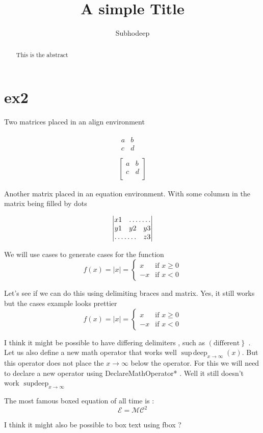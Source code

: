 \documentclass{article}[12pt]
\DeclareMathOperator*{\supdeep}{supdeep}
\begin{document}
\title{A simple Title}
\author{Subhodeep}

\maketitle

\begin{abstract}
This is the abstract
\end{abstract}

\section{ex2}

Two matrices placed in an align environment

\begin{align}
\begin{matrix}
a&b\\
c&d\\
\end{matrix}\\
\begin{bmatrix}
a&b\\
c&d\\
\end{bmatrix}
\end{align}

Another matrix placed in an equation environment. With some columsn in the matrix being filled by dots

\begin{equation}
\begin{vmatrix}
x1 & \hdotsfor{2} \\
y1 & y2 & y3 \\
\hdotsfor{2} & z3
\end{vmatrix}
\end{equation}

We will use cases to generate cases for the function
\[
f(x) = \vert x \vert = \begin{cases}
x& \text{if $x \geq 0$} \\
-x& \text{if $x < 0 $}
\end{cases}
\]

Let's see if we can do this using delimiting braces and matrix. Yes, it still works but the cases example looks prettier 
\[
f(x) = \vert x \vert = \left\{ \begin{matrix}
x& \text{if $x \geq 0$} \\
-x& \text{if $x < 0 $} 
\end{matrix} \right.
\]

I think it might be possible to have differing delimiters , such as $\left( \text{different} \right\}$ . Let us also define a new math operator that works well $\operatorname{sup\,deep}_{x\rightarrow\infty}(x)$. 
But this operator does not place the $x\rightarrow\infty$ below the operator. For this we will need to declare a new operator using DeclareMathOperator* .
Well it still doesn't work $\supdeep_{x\rightarrow\infty}$


The most famous boxed equation of all time is :
\[
\boxed{\mathcal{E}=\mathcal{MC}^2}
\]

I think it might also be possible to box text using fbox ? 
\end{document}
